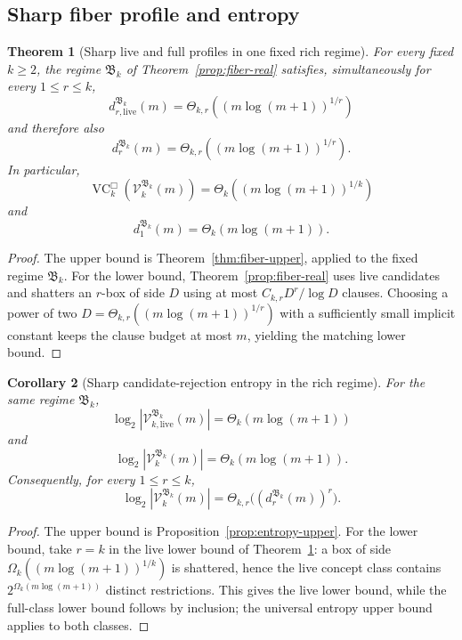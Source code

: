\documentclass[11pt]{article}
\newtheorem{theorem}{Theorem}[section]
\newtheorem{corollary}[theorem]{Corollary}
\theoremstyle{definition}
\theoremstyle{remark}
\newcommand{\VCbox}{\operatorname{VC}^{\Box}}
\begin{document}
\subsection{Sharp fiber profile and entropy}

\begin{theorem}[Sharp live and full profiles in one fixed rich regime]
\label{thm:sharp-profile}
For every fixed \(k\ge2\), the regime \(\mathfrak B_k\) of
Theorem~\ref{prop:fiber-real} satisfies, simultaneously for every
\(1\le r\le k\),
\[
\boxed{
d_{r,\mathrm{live}}^{\mathfrak B_k}(m)
=
\Theta_{k,r}\!\left((m\log(m+1))^{1/r}\right)
}
\]
and therefore also
\[
\boxed{
d_r^{\mathfrak B_k}(m)
=
\Theta_{k,r}\!\left((m\log(m+1))^{1/r}\right).
}
\]
In particular,
\[
\VCbox_k(\mathcal V_k^{\mathfrak B_k}(m))
=
\Theta_k\!\left((m\log(m+1))^{1/k}\right)
\]
and
\[
d_1^{\mathfrak B_k}(m)=\Theta_k(m\log(m+1)).
\]
\end{theorem}

\begin{proof}
The upper bound is Theorem~\ref{thm:fiber-upper}, applied to the fixed regime
\(\mathfrak B_k\). For the lower bound, Theorem~\ref{prop:fiber-real} uses live candidates and shatters
an \(r\)-box of side \(D\) using at most
\(C_{k,r}D^r/\log D\)
clauses. Choosing a power of two
\(D=\Theta_{k,r}((m\log(m+1))^{1/r})\)
with a sufficiently small implicit constant keeps the clause budget at most
\(m\), yielding the matching lower bound.
\end{proof}

\begin{corollary}[Sharp candidate-rejection entropy in the rich regime]
\label{cor:entropy-sharp}
For the same regime \(\mathfrak B_k\),
\[
\boxed{
\log_2|\mathcal V_{k,\mathrm{live}}^{\mathfrak B_k}(m)|
=
\Theta_k(m\log(m+1))
}
\]
and
\[
\boxed{
\log_2|\mathcal V_k^{\mathfrak B_k}(m)|
=
\Theta_k(m\log(m+1)).
}
\]
Consequently, for every \(1\le r\le k\),
\[
\log_2|\mathcal V_k^{\mathfrak B_k}(m)|
=
\Theta_{k,r}\bigl((d_r^{\mathfrak B_k}(m))^r\bigr).
\]
\end{corollary}

\begin{proof}
The upper bound is Proposition~\ref{prop:entropy-upper}. For the lower bound,
take \(r=k\) in the live lower bound of Theorem~\ref{thm:sharp-profile}: a box of side
\(\Omega_k((m\log(m+1))^{1/k})\) is shattered, hence the live concept class contains
\(2^{\Omega_k(m\log(m+1))}\) distinct restrictions.  This gives the live
lower bound, while the full-class lower bound follows by inclusion; the
universal entropy upper bound applies to both classes.
\end{proof}
\end{document}

